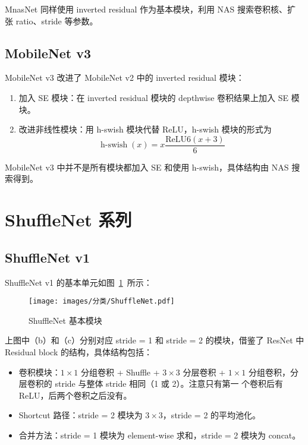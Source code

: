 MnasNet 同样使用 inverted residual 作为基本模块，利用 NAS 搜索卷积核、扩
张 ratio、stride 等参数。

\subsection{MobileNet v3}
MobileNet v3 改进了 MobileNet v2 中的 inverted residual 模块：

\begin{enumerate}
  \item 加入 SE 模块：在 inverted residual 模块的 depthwise 卷积结果上加入 SE 模块。
  \item 改进非线性模块：用 h-swish 模块代替 ReLU，h-swish 模块的形式为
    \begin{equation}
      \operatorname{h-swish}(x) = x \frac{\mathrm{ReLU}6 (x+3)}{6}
    \end{equation}
\end{enumerate}

MobileNet v3 中并不是所有模块都加入 SE 和使用 h-swish，具体结构由 NAS 搜索得到。

\section{ShuffleNet 系列}
\subsection{ShuffleNet v1}
ShuffleNet v1 的基本单元如图~\ref{fig:shufflenet}~所示：

\begin{figure}[ht]
  \centering
  \texttt{[image: images/分类/ShuffleNet.pdf]}
  \caption{ShuffleNet 基本模块}\label{fig:shufflenet}
\end{figure}

上图中（b）和（c）分别对应 stride = 1 和 stride = 2 的模块，借鉴了 ResNet 中
Residual block 的结构，具体结构包括：

\begin{itemize}
  \item 卷积模块：$1 \times 1$ 分组卷积 + Shuffle + $3 \times 3$ 分层卷积 + $1
    \times 1$ 分组卷积，分层卷积的 stride 与整体 stride 相同（1 或 2）。注意只有第一
    个卷积后有 ReLU，后两个卷积之后没有。
  \item Shortcut 路径：stride = 2 模块为 $3 \times 3$，stride = 2 的平均池化。
  \item 合并方法：stride = 1 模块为 element-wise 求和，stride = 2 模块为 concat。
\end{itemize}

